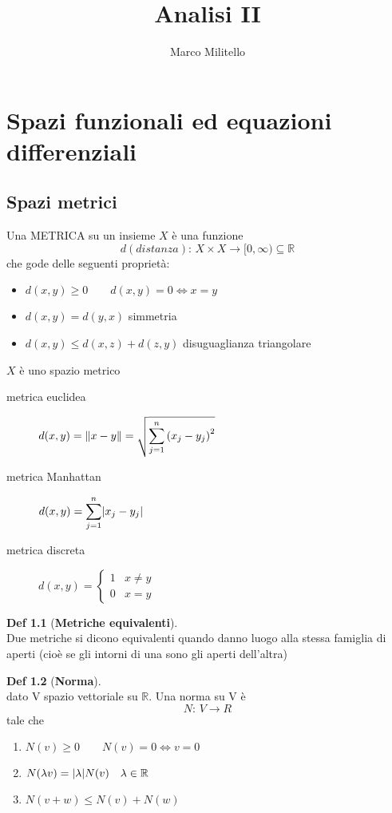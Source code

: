 \documentclass[a4paper,11pt]{report}
\theoremstyle{remark}
\theoremstyle{definition}
\newtheorem*{Def}{Def}
\newcommand{\R}{\mathbb{R}}
\DeclarePairedDelimiter{\abs}{\lvert}{\rvert}
\DeclarePairedDelimiter{\norma}{\lVert}{\rVert}
\begin{document}
	\date{}
	\author{Marco Militello}
	\title{Analisi II}
	\maketitle
	\tableofcontents
	\newpage
	
\chapter{Spazi funzionali ed equazioni differenziali}	
\section{Spazi metrici}
Una METRICA su un insieme $X$ è una funzione
\[d(distanza): \, X\times X \to [0,\infty) \subseteq \R\]
che gode delle seguenti proprietà:
\begin{itemize}
	\item $d(x,y) \geq 0 \qquad d(x,y) =0 \iff x=y$
	\item $d(x,y)=d(y,x)$ \quad simmetria
	\item $d(x,y) \leq d(x,z)+d(z,y)$ \quad disuguaglianza triangolare
\end{itemize}
\noindent $X$ è uno spazio metrico
\begin{description}
	\item[metrica euclidea] $\displaystyle d(x,y) =\norma{x-y} = \sqrt{\sum_{j=1}^{n} {(x_j-y_j)}^2}$
	\item[metrica Manhattan] $\displaystyle d(x,y) = \sum_{j=1}^{n} \abs{x_j-y_j}$
	\item[metrica discreta] $d(x,y) = \begin{cases} 1 & x \ne y \\ 0 & x=y \end{cases} $
\end{description}
\begin{Def}[\textbf{Metriche equivalenti}]\hfil\\
	Due metriche si dicono equivalenti quando danno luogo alla stessa famiglia di aperti (cioè se gli intorni di una sono gli aperti dell'altra)
\end{Def}
\begin{Def}[\textbf{Norma}]\hfil\\
	dato V spazio vettoriale su $\R$. Una norma su V è 
	\[N: \, V \to R\]
	tale che 
	\begin{enumerate}
		\item $N(v) \geq 0 \qquad N(v)=0 \iff v=0$
		\item $N(\lambda v)= \abs{\lambda}N(v) \quad \lambda \in \R$
		\item $N(v+w) \leq N(v)+N(w)$
	\end{enumerate}
\end{Def}
\end{document}
